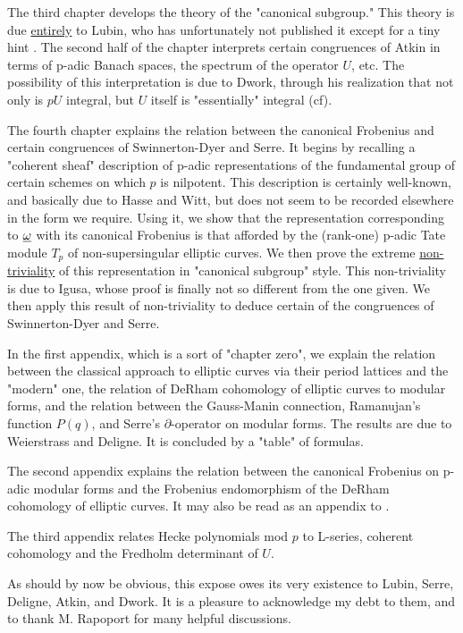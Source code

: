 The third chapter develops the theory of the "canonical subgroup." This theory
is due \uline{entirely} to Lubin, who has unfortunately not published it except
for a tiny hint \cite{lubin-newton}. The second half of the chapter interprets certain
congruences of Atkin in terms of p-adic Banach spaces, the spectrum of the
operator $U$, etc. The possibility of this interpretation is due to Dwork,
through his realization that not only is $pU$ integral, but $U$ itself is
"essentially" integral (cf\cite{dwork-involume}).

The fourth chapter explains the relation between the canonical Frobenius and
certain congruences of Swinnerton-Dyer and Serre. It begins by recalling a
"coherent sheaf" description of p-adic representations of the fundamental
group of certain schemes on which $p$ is nilpotent. This description is
certainly well-known, and basically due to Hasse and Witt, but does not seem to
be recorded elsewhere in the form we require. Using it, we show that the
representation corresponding to $\underline{\omega}$ with its canonical Frobenius is that
afforded by the (rank-one) p-adic Tate module $T_p$ of non-supersingular
elliptic curves. We then prove the extreme \uline{non-triviality} of this
representation in "canonical subgroup" style. This non-triviality is due to
Igusa, whose proof is finally not so different from the one given. We then
apply this result of non-triviality to deduce certain of the congruences of
Swinnerton-Dyer and Serre.

In the first appendix, which is a sort of "chapter zero", we explain the
relation between the classical approach to elliptic curves via their period
lattices and the "modern" one, the relation of DeRham cohomology of elliptic
curves to modular forms, and the relation between the Gauss-Manin connection,
Ramanujan's function $P(q)$, and Serre's $\partial$-operator on modular forms.
The results are due to Weierstrass and Deligne. It is concluded by a "table" of
formulas.

The second appendix explains the relation between the canonical Frobenius on
p-adic modular forms and the Frobenius endomorphism of the DeRham cohomology
of elliptic curves. It may also be read as an appendix to \cite{katz73}.

The third appendix relates Hecke polynomials mod $p$ to L-series, coherent
cohomology and the Fredholm determinant of $U$.

As should by now be obvious, this expose owes its very existence to Lubin,
Serre, Deligne, Atkin, and Dwork. It is a pleasure to acknowledge my debt to
them, and to thank M. Rapoport for many helpful discussions.
